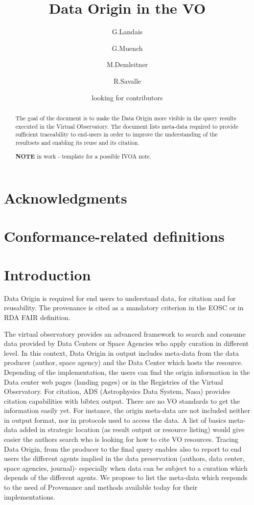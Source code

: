 \documentclass[11pt,a4paper]{ivoa}
\title{Data Origin in the VO}
\author{G.Landais}
\author{G.Muench}
\author{M.Demleitner}
\author{R.Savalle}
\author{looking for contributors}
\begin{document}
\begin{abstract}
The goal of the document is to make the Data Origin more visible in the query results executed in the Virtual Observatory. 
The document lists meta-data required to provide sufficient traceability to end-users in order to improve the understanding 
of the resultsets and enabling its reuse and its citation.

\textbf{NOTE} in work -  template for a possible IVOA note.

\end{abstract}


\section*{Acknowledgments}


\section*{Conformance-related definitions}


\section{Introduction}

Data Origin is required for end users to understand data, for citation and for reusability. The  provenance is cited as a mandatory criterion in the EOSC or in RDA FAIR definition. 

The virtual observatory provides an advanced framework to search and consume data provided by Data Centers or Space Agencies who apply curation in different level.  In this context, Data Origin in output includes meta-data from the data producer (author, space agency) and the Data Center which hosts the resource. 
Depending of the implementation, the users can find the origin information in the Data center web pages (landing pages) or in the Registries of the Virtual Observatory. For citation, ADS (Astrophysics Data System, Nasa) provides citation capabilities with bibtex output. There are no VO standards to get the information easily yet. For instance, the origin meta-data are not included neither in output format, nor in protocols used to access the data.
A list of basics meta-data added in strategic location (as result output or resource listing) would give easier the authors search who is looking for how to cite VO resources. Tracing Data Origin, from the producer to the final query enables also to report to end users the different agents implied in the data preservation (authors, data center, space agencies, journal)- especially when data can be subject to a curation  which depends of the different agents.
We propose to list the meta-data which responds to the need of Provenance and methods available today for their implementations. 
\end{document}
